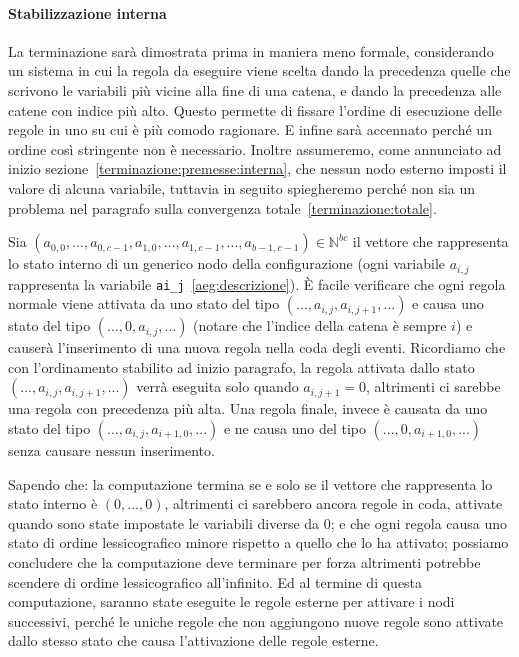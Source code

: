 \documentclass[12pt, a4paper]{article}
\begin{document}
\paragraph{Stabilizzazione interna}\label{terminazione:interna}

La terminazione sarà dimostrata prima in maniera meno formale, considerando un sistema in cui la regola da eseguire viene scelta dando la precedenza quelle che scrivono le variabili più vicine alla fine di una catena, e dando la precedenza alle catene con indice più alto. Questo permette di fissare l'ordine di esecuzione delle regole in uno su cui è più comodo ragionare. E infine sarà accennato perché un ordine così stringente non è necessario.
Inoltre assumeremo, come annunciato ad inizio sezione~\ref{terminazione:premesse:interna}, che nessun nodo esterno imposti il valore di alcuna variabile, tuttavia in seguito spiegheremo perché non sia un problema nel paragrafo sulla convergenza totale~\ref{terminazione:totale}.

Sia $(a_{0,0},...,a_{0,c-1},a_{1,0},...,a_{1,c-1},...,a_{b-1,c-1})\in \mathbb{N}^{bc}$ il vettore che rappresenta lo stato interno di un generico nodo della configurazione (ogni variabile $a_{i,j}$ rappresenta la variabile \lstinline{ai_j}~\ref{aeg:descrizione}). È facile verificare che ogni regola normale viene attivata da uno stato del tipo $(...,a_{i,j},a_{i,j+1},...)$ e causa uno stato del tipo $(...,0,a_{i,j},...)$ (notare che l'indice della catena è sempre $i$) e causerà l'inserimento di una nuova regola nella coda degli eventi.
Ricordiamo che con l'ordinamento stabilito ad inizio paragrafo, la regola attivata dallo stato $(...,a_{i,j},a_{i,j+1},...)$ verrà eseguita solo quando $a_{i,j+1}=0$, altrimenti ci sarebbe una regola con precedenza più alta.
Una regola finale, invece è causata da uno stato del tipo $(...,a_{i,j},a_{i+1,0},...)$ e ne causa uno del tipo $(...,0,a_{i+1,0},...)$ senza causare nessun inserimento.

Sapendo che: la computazione termina se e solo se il vettore che rappresenta lo stato interno è $(0,...,0)$, altrimenti ci sarebbero ancora regole in coda, attivate quando sono state impostate le variabili diverse da $0$; e che ogni regola causa uno stato di ordine lessicografico minore rispetto a quello che lo ha attivato; possiamo concludere che la computazione deve terminare per forza altrimenti potrebbe scendere di ordine lessicografico all'infinito.
Ed al termine di questa computazione, saranno state eseguite le regole esterne per attivare i nodi successivi, perché le uniche regole che non aggiungono nuove regole sono attivate dallo stesso stato che causa l'attivazione delle regole esterne.
\end{document}
